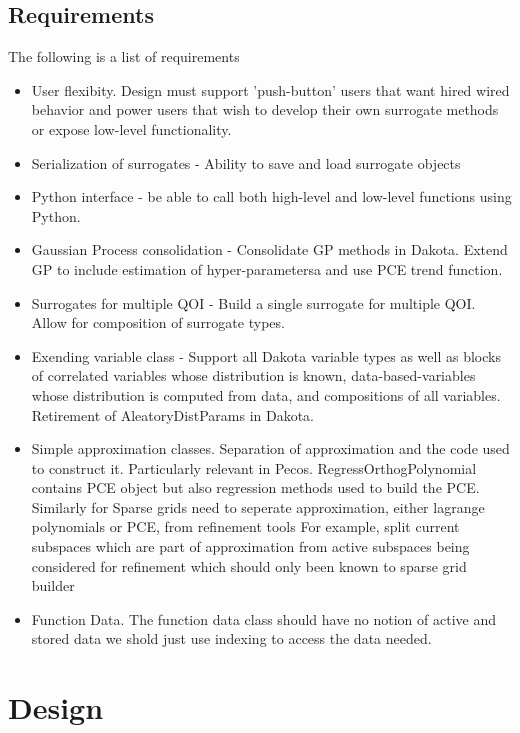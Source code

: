 \documentclass[dakotalogo]{dakota-article}
\newcommand{\myitem}{\item[\color{darkblue}\ding{228}]}
\begin{document}
\subsection{Requirements}
The following is a list of requirements
\begin{itemize}
\myitem User flexibity. Design must support 'push-button' users that want hired wired behavior and power users that wish to develop their own surrogate methods or expose low-level functionality.
\myitem Serialization of surrogates - Ability to save and load surrogate objects
\myitem Python interface - be able to call both high-level and low-level functions using Python. 
\myitem Gaussian Process consolidation - Consolidate GP methods in Dakota. Extend GP to include estimation of hyper-parametersa and use PCE trend function.
\myitem Surrogates for multiple QOI - Build a single surrogate for multiple QOI. Allow for composition of surrogate types.
\myitem Exending variable class - Support all Dakota variable types as well as blocks of correlated variables whose distribution is known, data-based-variables whose distribution is computed from data, and compositions of all variables. Retirement of AleatoryDistParams in Dakota.
\myitem Simple approximation classes. Separation of approximation and the code used to construct it. Particularly relevant in Pecos. RegressOrthogPolynomial contains PCE object but also regression methods used to build the PCE. Similarly for Sparse grids need to seperate approximation, either lagrange polynomials or PCE, from refinement tools For example, split current subspaces which are part of approximation from active subspaces being considered for refinement which should only been known to sparse grid builder 
\myitem Function Data. The function data class should have no notion of active and stored data we shold just use indexing to access the data needed. 
\end{itemize}


\section{Design}
\end{document}
